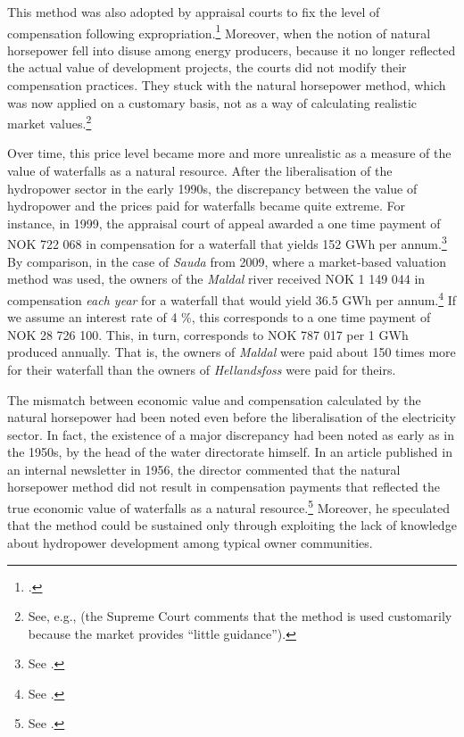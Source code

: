 This method was also adopted by appraisal courts to fix the level of compensation following expropriation.\footnote{\cite[521]{vislie02}.} Moreover, when the notion of natural horsepower fell into disuse among energy producers, because it no longer reflected the actual value of development projects, the courts did not modify their compensation practices. They stuck with the natural horsepower method, which was now applied on a customary basis, not as a way of calculating realistic market values.\footnote{See, e.g., \cite[1599]{hellandsfoss99} (the Supreme Court comments that the method is used customarily because the market provides ``little guidance'').} %

Over time, this price level became more and more unrealistic as a measure of the value of waterfalls as a natural resource. After the liberalisation of the hydropower sector in the early 1990s, the discrepancy between the value of hydropower and the prices paid for waterfalls became quite extreme. For instance, in 1999, the appraisal court of appeal awarded a one time payment of NOK 722 068 in compensation for a waterfall that yields 152 GWh per annum.\footnote{See \cite{hellandsfoss99}.} By comparison, in the case of {\it Sauda} from 2009, where a market-based valuation method was used, the owners of the {\it Maldal} river received NOK 1 149 044 in compensation {\it each year} for a waterfall that would yield 36.5 GWh per annum.\footnote{See \cite{sauda09}.} If we assume an interest rate of 4 \%, this corresponds to a one time payment of NOK 28 726 100. This, in turn, corresponds to NOK 787 017 per 1 GWh produced annually. That is, the owners of {\it Maldal} were paid about 150 times more for their waterfall than the owners of {\it Hellandsfoss} were paid for theirs.

The mismatch between economic value and compensation calculated by the natural horsepower had been noted even before the liberalisation of the electricity sector. In fact, the existence of a major discrepancy had been noted as early as in the 1950s, by the head of the water directorate himself. In an article published in an internal newsletter in 1956, the director commented that the natural horsepower method did not result in compensation payments that reflected the true economic value of waterfalls as a natural resource.\footnote{See \cite{rogstad56}.} Moreover, he speculated that the method could be sustained only through exploiting the lack of knowledge about hydropower development among typical owner communities.

